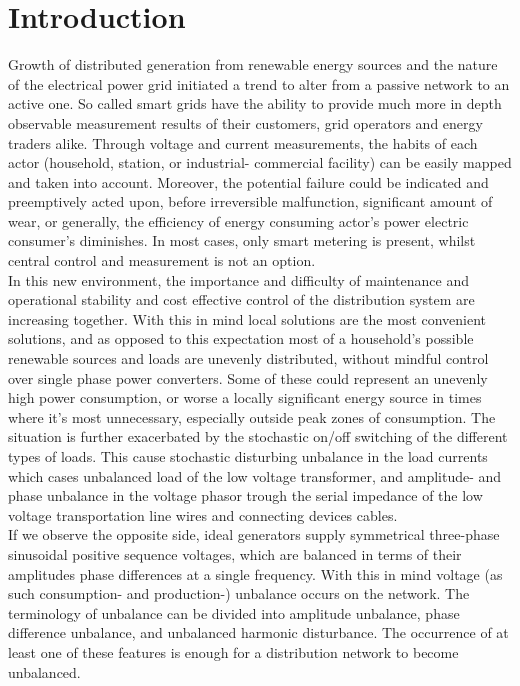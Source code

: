 \chapter{Introduction}

Growth of distributed generation from renewable energy sources and the nature of the electrical power grid initiated a trend to alter from a passive network to an active one. So called smart grids have the ability to provide much more in depth observable measurement results of their customers, grid operators and energy traders alike. Through voltage and current measurements, the habits of each actor (household, station, or industrial- commercial facility) can be easily mapped and taken into account. Moreover, the potential failure could be indicated and preemptively acted upon, before irreversible malfunction, significant amount of wear, or generally, the efficiency of energy consuming actor's power electric consumer's diminishes. In most cases, only smart metering is present, whilst central control and measurement is not an option.\\
In this new environment, the importance and difficulty of maintenance and operational stability and cost effective control of the distribution system are increasing together. With this in mind local solutions are the most convenient solutions, and as opposed to this expectation most of a household's possible renewable sources and loads are unevenly distributed, without mindful control over single phase power converters. Some of these could represent an unevenly high power consumption, or worse a locally significant energy source in times where it's most unnecessary, especially outside peak zones of consumption. The situation is further exacerbated by the stochastic on/off switching of the different types of loads. This cause stochastic disturbing unbalance in the load currents which cases unbalanced load of the low voltage transformer, and amplitude- and phase unbalance in the voltage phasor trough the serial impedance of the low voltage transportation line wires and connecting devices cables.\\
If we observe the opposite side, ideal generators supply symmetrical three-phase sinusoidal positive sequence voltages, which are balanced in terms of their amplitudes phase differences at a single frequency. With this in mind voltage (as such consumption- and production-) unbalance occurs on the network. The terminology of unbalance can be divided into amplitude unbalance, phase difference unbalance, and unbalanced harmonic disturbance. The occurrence of at least one of these features is enough for a distribution network to become unbalanced. \\
